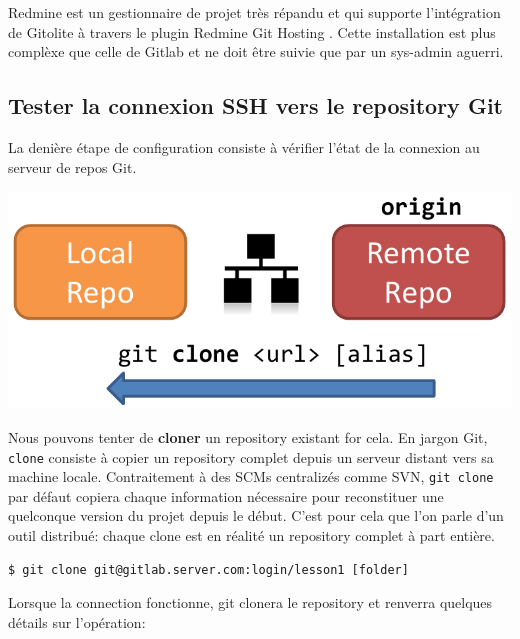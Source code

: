 \documentclass[a4paper]{../../common/tufte-latex/tufte-handout}
\begin{document}
\noindent Redmine est un gestionnaire de projet très répandu et qui supporte l'intégration de Gitolite à travers le plugin Redmine Git Hosting . Cette installation est plus complèxe que celle de Gitlab et ne doit être suivie que par un sys-admin aguerri.

\subsection{Tester la connexion SSH vers le repository Git}

La denière étape de configuration consiste à vérifier l'état de la connexion au serveur de repos Git.

\begin{marginfigure}%
  \centering
  \includegraphics[width=\linewidth]{gitclone-schema.pdf}
  \label{fig:gitclone}
\end{marginfigure}
Nous pouvons tenter de \textbf{cloner} un repository existant for cela.
En jargon Git, \texttt{clone} consiste à copier un repository complet depuis un serveur distant vers sa machine locale.
Contraitement à des SCMs centralizés comme SVN, \texttt{git clone} par défaut copiera chaque information nécessaire pour reconstituer une quelconque version du projet depuis le début.
C'est pour cela que l'on parle d'un outil distribué: chaque clone est en réalité un repository complet à part entière.

\begin{lstlisting}[style=BashInputStyle]
  $ git clone git@gitlab.server.com:login/lesson1 [folder]
\end{lstlisting}

\noindent Lorsque la connection fonctionne, git clonera le repository et renverra quelques détails sur l'opération:
\end{document}
